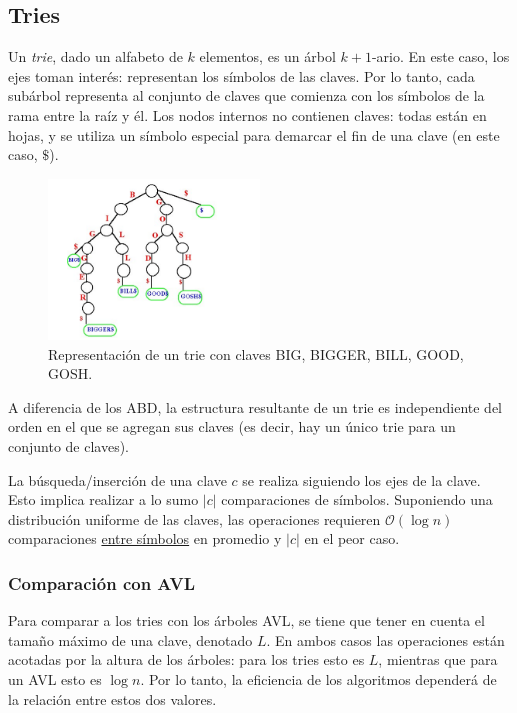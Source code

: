 \documentclass{article}
\newcommand{\BigO}[1]{{\mathcal{O}(#1)}}
\begin{document}
\subsection{Tries}

Un \textit{trie}, dado un alfabeto de $k$ elementos, es un árbol ${k+1}$-ario. En este caso, los ejes toman interés: representan los símbolos de las claves. Por lo tanto, cada subárbol representa al conjunto de claves que comienza con los símbolos de la rama entre la raíz y él. Los nodos internos no contienen claves: todas están en hojas, y se utiliza un símbolo especial para demarcar el fin de una clave (en este caso, $\$$).

    \label{fig-trie}
    \begin{figure}[H]
        \centering
        \includegraphics[width=0.5\textwidth]{trie.png}
        \caption*{Representación de un trie con claves BIG, BIGGER, BILL, GOOD, GOSH.}
    \end{figure}

    A diferencia de los ABD, la estructura resultante de un trie es independiente del orden en el que se agregan sus claves (es decir, hay un único trie para un conjunto de claves).

    La búsqueda/inserción de una clave $c$ se realiza siguiendo los ejes de la clave. Esto implica realizar a lo sumo $|c|$ comparaciones de símbolos. Suponiendo una distribución uniforme de las claves, las operaciones requieren $\BigO{\log{n}}$ comparaciones \underline{entre símbolos} en promedio y $|c|$ en el peor caso.

    \subsubsection{Comparación con AVL}

    Para comparar a los tries con los árboles AVL, se tiene que tener en cuenta el tamaño máximo de una clave, denotado $L$. En ambos casos las operaciones están acotadas por la altura de los árboles: para los tries esto es $L$, mientras que para un AVL esto es $\log{n}$. Por lo tanto, la eficiencia de los algoritmos dependerá de la relación entre estos dos valores.
\end{document}
